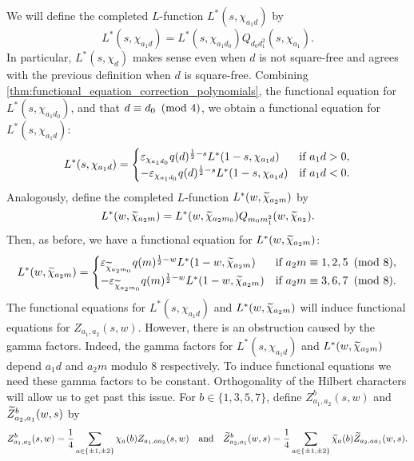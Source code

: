 \documentclass[12pt,reqno,oneside]{amsart}
\begin{document}
    We will define the completed $L$-function $L^{\ast}(s,\chi_{a_{1}d})$ by
    \[
        L^{\ast}(s,\chi_{a_{1}d}) = L^{\ast}(s,\chi_{a_{1}d_{0}})Q_{d_{0}d_{1}^{2}}(s,\chi_{a_{1}}).
    \]
    In particular, $L^{\ast}(s,\chi_{d})$ makes sense even when $d$ is not square-free and agrees with the previous definition when $d$ is square-free.
    Combining \cref{thm:functional_equation_correction_polynomials}, the functional equation for $L^{\ast}(s,\chi_{a_{1}d_{0}})$, and that $d \equiv d_{0} \ \left(\text{mod }4\right)$, we obtain a functional equation for $L^{\ast}(s,\chi_{a_{1}d})$:
    \[
        L^{\ast}(s,\chi_{a_{1}d}) = \begin{cases} \varepsilon_{\chi_{a_{1}d_{0}}}q(d)^{\frac{1}{2}-s}L^{\ast}(1-s,\chi_{a_{1}d}) & \text{if $a_{1}d > 0$}, \\ -\varepsilon_{\chi_{a_{1}d_{0}}}q(d)^{\frac{1}{2}-s}L^{\ast}(1-s,\chi_{a_{1}d}) & \text{if $a_{1}d < 0$}. \end{cases}
    \]
    Analogously, define the completed $L$-function $L^{\ast}(w,\widetilde{\chi}_{a_{2}m})$ by
    \[
        L^{\ast}(w,\widetilde{\chi}_{a_{2}m}) = L^{\ast}(w,\widetilde{\chi}_{a_{2}m_{0}})Q_{m_{0}m_{1}^{2}}(w,\widetilde{\chi}_{a_{2}}).
    \]
    Then, as before, we have a functional equation for $L^{\ast}(w,\widetilde{\chi}_{a_{2}m})$:
    \[
        L^{\ast}(w,\widetilde{\chi}_{a_{2}m}) = \begin{cases} \varepsilon_{\widetilde{\chi}_{a_{2}m_{0}}}q(m)^{\frac{1}{2}-w}L^{\ast}(1-w,\widetilde{\chi}_{a_{2}m}) & \text{if $a_{2}m \equiv 1,2,5 \ \left(\text{mod }8\right)$}, \\ -\varepsilon_{\widetilde{\chi}_{a_{2}m_{0}}}q(m)^{\frac{1}{2}-w}L^{\ast}(1-w,\widetilde{\chi}_{a_{2}m}) & \text{if $a_{2}m \equiv 3,6,7 \ \left(\text{mod }8\right)$}. \end{cases}
    \]
    The functional equations for $L^{\ast}(s,\chi_{a_{1}d})$ and $L^{\ast}(w,\widetilde{\chi}_{a_{2}m})$ will induce functional equations for $Z_{a_{1},a_{2}}(s,w)$. However, there is an obstruction caused by the gamma factors. Indeed, the gamma factors for $L^{\ast}(s,\chi_{a_{1}d})$ and $L^{\ast}(w,\widetilde{\chi}_{a_{2}m})$ depend $a_{1}d$ and $a_{2}m$ modulo $8$ respectively. To induce functional equations we need these gamma factors to be constant. Orthogonality of the Hilbert characters will allow us to get past this issue. For $b \in \{1,3,5,7\}$, define $Z_{a_{1},a_{2}}^{b}(s,w)$ and $\widetilde{Z}_{a_{2},a_{1}}^{b}(w,s)$ by
    \[
        Z_{a_{1},a_{2}}^{b}(s,w) = \frac{1}{4}\sum_{a \in \{\pm1,\pm2\}}\chi_{a}(b)Z_{a_{1},aa_{2}}(s,w) \quad \text{and} \quad \widetilde{Z}_{a_{2},a_{1}}^{b}(w,s) = \frac{1}{4}\sum_{a \in \{\pm1,\pm2\}}\widetilde{\chi}_{a}(b)\widetilde{Z}_{a_{2},aa_{1}}(w,s).
    \]
\end{document}
